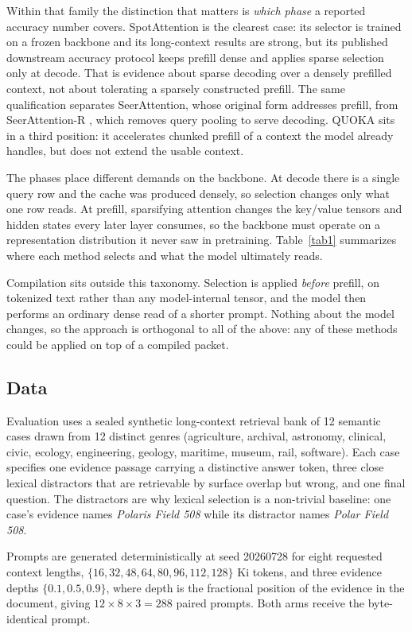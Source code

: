 \documentclass[conference]{IEEEtran}
\begin{document}
Within that family the distinction that matters is \emph{which phase} a reported
accuracy number covers. SpotAttention is the clearest case: its selector is trained on a
frozen backbone and its long-context results are strong, but its published
downstream accuracy protocol keeps prefill dense and applies sparse selection only at
decode. That is evidence about sparse decoding over a densely prefilled context, not
about tolerating a sparsely constructed prefill. The same qualification separates SeerAttention, whose original form addresses
prefill, from SeerAttention-R \cite{seerr}, which removes query pooling to serve decoding. QUOKA \cite{quoka} sits in a third
position: it accelerates chunked prefill of a context the model already handles, but
does not extend the usable context.

The phases place different demands on the backbone. At decode there is a single
query row and the cache was produced densely, so selection changes only what one row
reads. At prefill, sparsifying attention changes the key/value tensors and hidden
states every later layer consumes, so the backbone must operate on a representation
distribution it never saw in pretraining. Table~\ref{tab1} summarizes where each
method selects and what the model ultimately reads.

Compilation sits outside this taxonomy. Selection is applied \emph{before} prefill,
on tokenized text rather than any model-internal tensor, and the model then performs
an ordinary dense read of a shorter prompt. Nothing about the model changes, so the
approach is orthogonal to all of the above: any of these methods could be applied on
top of a compiled packet.

\subsection{Data}

Evaluation uses a sealed synthetic long-context retrieval bank of 12 semantic cases
drawn from 12 distinct genres (agriculture, archival, astronomy, clinical, civic,
ecology, engineering, geology, maritime, museum, rail, software). Each case
specifies one evidence passage carrying a distinctive answer token, three close
lexical distractors that are retrievable by surface overlap but wrong, and one final
question. The distractors are why lexical selection is a non-trivial baseline: one
case's evidence names \emph{Polaris Field 508} while its distractor names
\emph{Polar Field 508}.

Prompts are generated deterministically at seed 20260728 for eight requested context
lengths, $\{16, 32, 48, 64, 80, 96, 112, 128\}$ Ki tokens, and three evidence depths
$\{0.1, 0.5, 0.9\}$, where depth is the fractional position of the evidence in the
document, giving $12\times8\times3=288$ paired prompts. Both arms receive the
byte-identical prompt.
\end{document}
